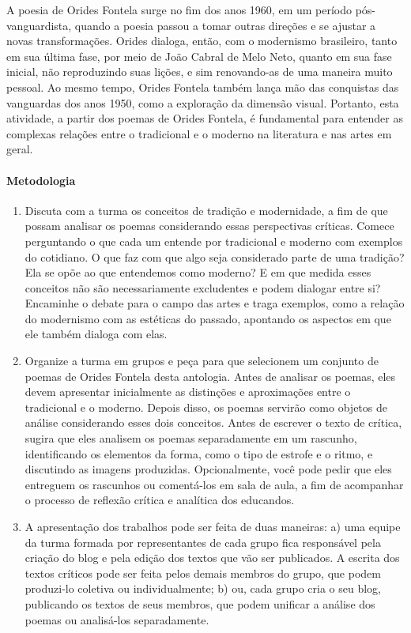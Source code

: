 \documentclass[12pt]{extarticle}
\begin{document}
A poesia de Orides Fontela surge no fim dos anos 1960, em um período
pós-vanguardista, quando a poesia passou a tomar outras direções e se
ajustar a novas transformações. Orides dialoga, então, com o modernismo
brasileiro, tanto em sua última fase, por meio de João Cabral de Melo
Neto, quanto em sua fase inicial, não reproduzindo suas lições, e sim
renovando-as de uma maneira muito pessoal. Ao mesmo tempo, Orides
Fontela também lança mão das conquistas das vanguardas dos anos 1950,
como a exploração da dimensão visual. Portanto, esta atividade, a partir
dos poemas de Orides Fontela, é fundamental para entender as complexas
relações entre o tradicional e o moderno na literatura e nas artes em
geral.

\paragraph{Metodologia}
\begin{enumerate}
\item Discuta com a turma os conceitos de tradição e
modernidade, a fim de que possam analisar os poemas considerando essas
perspectivas críticas. Comece perguntando o que cada um entende por
tradicional e moderno com exemplos do cotidiano. O que faz com que algo
seja considerado parte de uma tradição? Ela se opõe ao que entendemos
como moderno? E em que medida esses conceitos não são necessariamente
excludentes e podem dialogar entre si? Encaminhe o debate para o campo
das artes e traga exemplos, como a relação do modernismo com as
estéticas do passado, apontando os aspectos em que ele também dialoga
com elas.

\item Organize a turma em grupos e peça para que selecionem um conjunto de
poemas de Orides Fontela desta antologia. Antes de analisar os poemas,
eles devem apresentar inicialmente as distinções e aproximações entre o
tradicional e o moderno. Depois disso, os poemas servirão como objetos
de análise considerando esses dois conceitos. Antes de escrever o texto
de crítica, sugira que eles analisem os poemas separadamente em um
rascunho, identificando os elementos da forma, como o tipo de estrofe e
o ritmo, e discutindo as imagens produzidas. Opcionalmente, você pode
pedir que eles entreguem os rascunhos ou comentá-los em sala de aula, a
fim de acompanhar o processo de reflexão crítica e analítica dos
educandos.

\item A apresentação dos trabalhos pode ser feita de duas maneiras: a) uma
equipe da turma formada por representantes de cada grupo fica
responsável pela criação do blog e pela edição dos textos que vão ser
publicados. A escrita dos textos críticos pode ser feita pelos demais
membros do grupo, que podem produzi-lo coletiva ou individualmente; b)
ou, cada grupo cria o seu blog, publicando os textos de seus membros,
que podem unificar a análise dos poemas ou analisá-los separadamente.
\end{enumerate}
\end{document}
